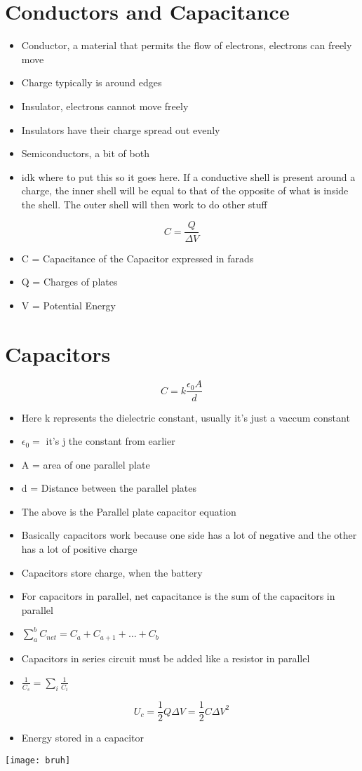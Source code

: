 \documentclass{article}
\begin{document}
\section{Conductors and Capacitance}
\begin{itemize}
	\item Conductor, a material that permits the flow of electrons, electrons can freely move
	\item Charge typically is around edges
	\item Insulator, electrons cannot move freely
		\item Insulators have their charge spread out evenly
	\item Semiconductors, a bit of both
	\item idk where to put this so it goes here. If a conductive shell is present around a charge, the inner shell will be equal to that of the opposite of what is inside the shell. The outer shell will then work to do other stuff
\end{itemize}
\[
C=\frac{Q}{\Delta V}
\]
\begin{itemize}
	\item C = Capacitance of the Capacitor expressed in farads
	\item Q = Charges of plates
	\item V = Potential Energy
\end{itemize}
\section{Capacitors}
	\[
		C=k\frac{\epsilon_{0}A}{d}
	\]
	\begin{itemize}
		\item Here k represents the dielectric constant, usually it's just a vaccum constant
		\item $\epsilon_{0} = $ it's j the constant from earlier
		\item A = area of one parallel plate
		\item d = Distance between the parallel plates
		\item The above is the Parallel plate capacitor equation
		\item Basically capacitors work because one side has a lot of negative and the other has a lot of positive charge
		\item Capacitors store charge, when the battery 
		\item For capacitors in parallel, net capacitance is the sum of the capacitors in parallel
		\item $\sum_{a}^{b} C_{net} = C_{a}+C_{a+1}+\ldots+C_{b}$
		\item Capacitors in series circuit must be added like a resistor in parallel
		\item $\frac{1}{C_{s}} = \sum_{i}\frac{1}{C_{i}}$
	\end{itemize}
\[
	U_{c} = \frac{1}{2} Q \Delta V = \frac{1}{2} C \Delta V^2
\]
\begin{itemize}
	\item Energy stored in a capacitor

\end{itemize}
	
\texttt{[image: bruh]}
\end{document}
